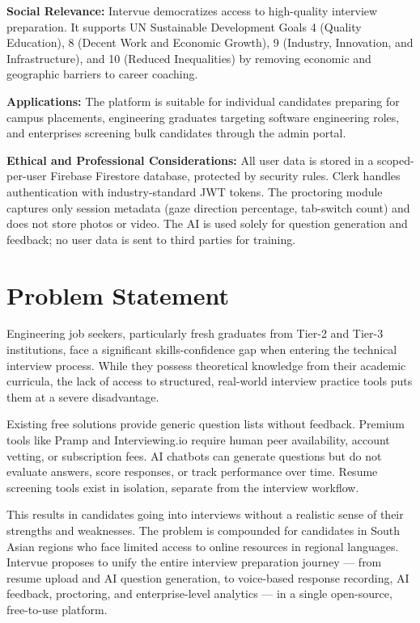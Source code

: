 \documentclass{fisatprojectfinal}
\begin{document}
\noindent\textbf{Social Relevance:}
Intervue democratizes access to high-quality interview preparation. It supports UN Sustainable
Development Goals 4 (Quality Education), 8 (Decent Work and Economic Growth), 9 (Industry,
Innovation, and Infrastructure), and 10 (Reduced Inequalities) by removing economic and
geographic barriers to career coaching.

\noindent\textbf{Applications:}
The platform is suitable for individual candidates preparing for campus placements, engineering
graduates targeting software engineering roles, and enterprises screening bulk candidates through
the admin portal.

\noindent\textbf{Ethical and Professional Considerations:}
All user data is stored in a scoped-per-user Firebase Firestore database, protected by
security rules. Clerk handles authentication with industry-standard JWT tokens. The
proctoring module captures only session metadata (gaze direction percentage, tab-switch
count) and does not store photos or video. The AI is used solely for question generation
and feedback; no user data is sent to third parties for training.

\section{Problem Statement}
Engineering job seekers, particularly fresh graduates from Tier-2 and Tier-3 institutions,
face a significant skills-confidence gap when entering the technical interview process.
While they possess theoretical knowledge from their academic curricula, the lack of access
to structured, real-world interview practice tools puts them at a severe disadvantage.

Existing free solutions provide generic question lists without feedback. Premium tools like
Pramp and Interviewing.io require human peer availability, account vetting, or subscription
fees. AI chatbots can generate questions but do not evaluate answers, score responses, or
track performance over time. Resume screening tools exist in isolation, separate from the
interview workflow.

This results in candidates going into interviews without a realistic sense of their strengths
and weaknesses. The problem is compounded for candidates in South Asian regions who face
limited access to online resources in regional languages. Intervue proposes to unify the
entire interview preparation journey --- from resume upload and AI question generation, to
voice-based response recording, AI feedback, proctoring, and enterprise-level analytics ---
in a single open-source, free-to-use platform.
\end{document}

